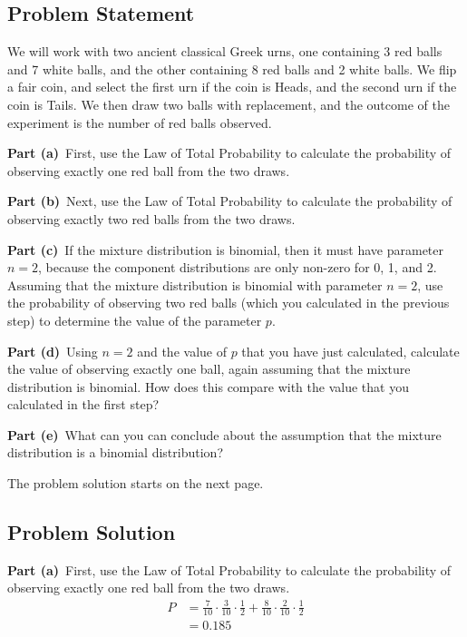\documentclass[12pt]{article}
\theoremstyle{definition}
\begin{document}
\subsection*{Problem Statement}

We will work with two ancient classical Greek urns, one containing 3 red balls and 7 white balls, and the other containing 8 red balls and 2 white balls. We flip a fair coin, and select the first urn if the coin is Heads, and the second urn if the coin is Tails. We then draw two balls with replacement, and the outcome of the experiment is the number of red balls observed.

\bigskip
\noindent
{\bf Part (a)}\ First, use the Law of Total Probability to calculate the probability of observing exactly one red ball from the two draws.

\bigskip
\noindent
{\bf Part (b)}\ Next, use the Law of Total Probability to calculate the probability of observing exactly two red balls from the two draws.

\bigskip
\noindent
{\bf Part (c)}\ If the mixture distribution is binomial, then it must have parameter $n = 2$, because the component distributions are only non-zero for 0, 1, and 2. Assuming that the  mixture distribution is binomial with parameter $n = 2$, use the probability of observing two red balls (which you calculated in the previous step) to determine the value of the parameter $p$.

\bigskip
\noindent
{\bf Part (d)}\ Using $n = 2$ and the value of $p$ that you have just calculated, calculate the value of observing exactly one ball, again assuming that the mixture distribution is binomial. How does this compare with the value that you calculated in the first step?

\bigskip
\noindent
{\bf Part (e)}\ What can you can conclude about the assumption that the mixture distribution is a binomial distribution?



\bigskip
\noindent
The problem solution starts on the next page.

\newpage
\subsection*{Problem Solution}

\noindent
{\bf Part (a)}\ First, use the Law of Total Probability to calculate the probability of observing exactly one red ball from the two draws.
\begin{align*}
P &= \frac{7}{10}\cdot\frac{3}{10}\cdot \frac{1}{2} + \frac{8}{10}\cdot\frac{2}{10}\cdot \frac{1}{2}\\
&= 0.185
\end{align*}
\end{document}

